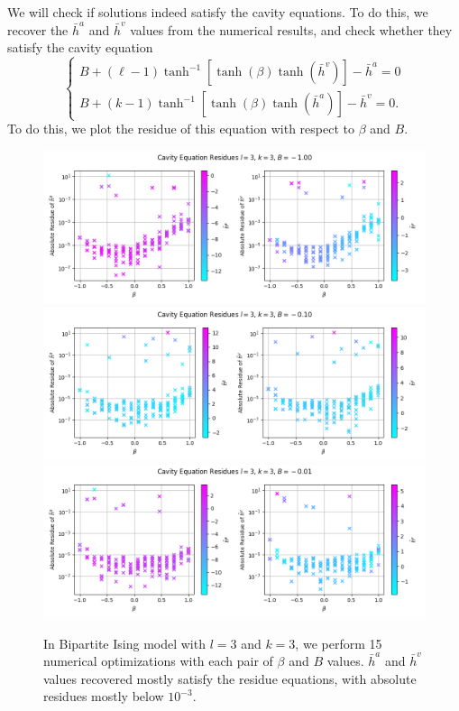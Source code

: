 \documentclass[12pt]{article}
\numberwithin{equation}{section}
\begin{document}
We will check if solutions indeed satisfy the cavity equations. To do this, we recover the $\bar{h}^a$ and $\bar{h}^v$ values from
the numerical results, and check whether they satisfy the cavity equation
\begin{equation*}
    \begin{cases}
        B + (\ell - 1)\tanh^{-1}[\tanh(\beta)\tanh(\bar{h}^v)] - \bar{h}^a = 0 \\
        B + (k - 1)\tanh^{-1}[\tanh(\beta)\tanh(\bar{h}^a)] - \bar{h}^v = 0.
    \end{cases}
\end{equation*}
To do this, we plot the residue of this equation with respect to $\beta$ and $B$.
\begin{figure}[!h]
    \centering
    \includegraphics[width=12cm]{img/Ising_bptt/cavity_equation/l=3,k=3,B=-1.0.png}
    \includegraphics[width=12cm]{img/Ising_bptt/cavity_equation/l=3,k=3,B=-0.1.png}
    \includegraphics[width=12cm]{img/Ising_bptt/cavity_equation/l=3,k=3,B=-0.01.png}
    \caption{In Bipartite Ising model with $l=3$ and $k=3$, we perform 15 numerical optimizations with each pair of $\beta$ and $B$ values.
        $\bar{h}^a$ and $\bar{h}^v$ values recovered mostly satisfy the residue equations, with absolute residues mostly below $10^{-3}$.}
    \label{Fig.ISBP-CE-l3k3-1}
\end{figure}
\end{document}
